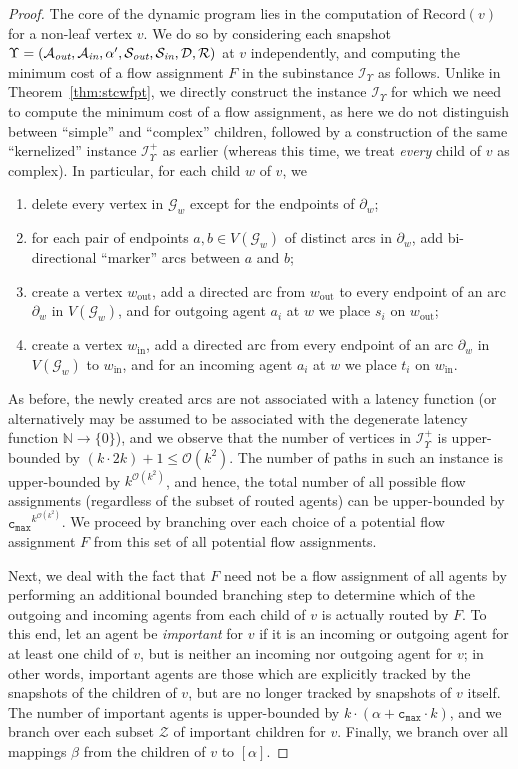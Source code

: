 \documentclass[letterpaper]{article} %
\newcommand{\bigoh}{\ensuremath{{\mathcal O}}}
\newcommand{\cmax}{\mathtt{c_{max}}}
\newcommand{\forgottenG}{\mathcal{G}}
\newcommand{\Rec}{\text{Record}}
\renewcommand{\R}{\mathcal{R}}
\renewcommand{\D}{\mathcal{D}}
\newcommand{\Sout}{\mathcal{S}_\emph{out}}
\newcommand{\Sin}{\mathcal{S}_\emph{in}}
\newcommand{\Aout}{\mathcal{A}_\emph{out}}
\newcommand{\Ain}{\mathcal{A}_\emph{in}}
\newcommand{\Imp}{\mathcal{Z}}
\begin{document}
\begin{proof}
The core of the dynamic program lies in the computation of $\Rec(v)$ for a non-leaf vertex $v$. We do so by considering each snapshot $\Upsilon=(\Aout,\Ain,\alpha',\Sout,\Sin,\D,\R)$ at $v$ independently, and computing the minimum cost of a flow assignment $F$ in the subinstance $\mathcal{I}_\Upsilon$ as follows. Unlike in Theorem~\ref{thm:stcwfpt}, we directly construct the instance $\mathcal{I}_\Upsilon$ for which we need to compute the minimum cost of a flow assignment, as here we do not distinguish between ``simple'' and ``complex'' children, followed by a construction of the same ``kernelized'' instance $\mathcal{I}^+_\Upsilon$ as earlier (whereas this time, we treat \emph{every} child of $v$ as complex).
In particular, for each child $w$ of $v$, we
\begin{enumerate}
\item delete every vertex in $\forgottenG_w$ except for the endpoints of $\partial_w$;
\item for each pair of endpoints $a,b\in V(\forgottenG_w)$ of distinct arcs in $\partial_w$, add bi-directional ``marker'' arcs between $a$ and $b$;
\item create a vertex $w_\text{out}$, add a directed arc from $w_\text{out}$ to every endpoint of an arc $\partial_w$ in $V(\forgottenG_w)$, and for outgoing agent $a_i$ at $w$ we place $s_i$ on $w_\text{out}$;
\item create a vertex $w_\text{in}$, add a directed arc from every endpoint of an arc $\partial_w$ in $V(\forgottenG_w)$ to $w_\text{in}$, and for an incoming agent $a_i$ at $w$ we place $t_i$ on $w_\text{in}$.
\end{enumerate}

As before, the newly created arcs are not associated with a latency function (or alternatively may be assumed to be associated with the degenerate latency function $\mathbb{N}\rightarrow \{0\}$), and we observe that the number of vertices in $\mathcal{I}^+_\Upsilon$ is upper-bounded by $(k\cdot 2k)+1\leq \bigoh(k^2)$. The number of paths in such an instance is upper-bounded by $k^{\bigoh(k^2)}$, and hence, the total number of all possible flow assignments (regardless of the subset of routed agents) can be upper-bounded by $\cmax^{k^{\bigoh(k^2)}}$. We proceed by branching over each choice of a potential flow assignment $F$ from this set of all potential flow assignments.

Next, we deal with the fact that $F$ need not be a flow assignment of all agents by performing an additional bounded branching step to determine which of the outgoing and incoming agents from each child of $v$ is actually routed by $F$. To this end, let an agent be \emph{important} for $v$ if it is an incoming or outgoing agent for at least one child of $v$, but is neither an incoming nor outgoing agent for $v$; in other words, important agents are those which are explicitly tracked by the snapshots of the children of $v$, but are no longer tracked by snapshots of $v$ itself. The number of important agents is upper-bounded by $k\cdot (\alpha+\cmax\cdot k)$, and we branch over each subset $\Imp$ of important children for $v$. Finally, we branch over all mappings $\beta$ from the children of $v$ to $[\alpha]$.



\end{proof}
\end{document}
